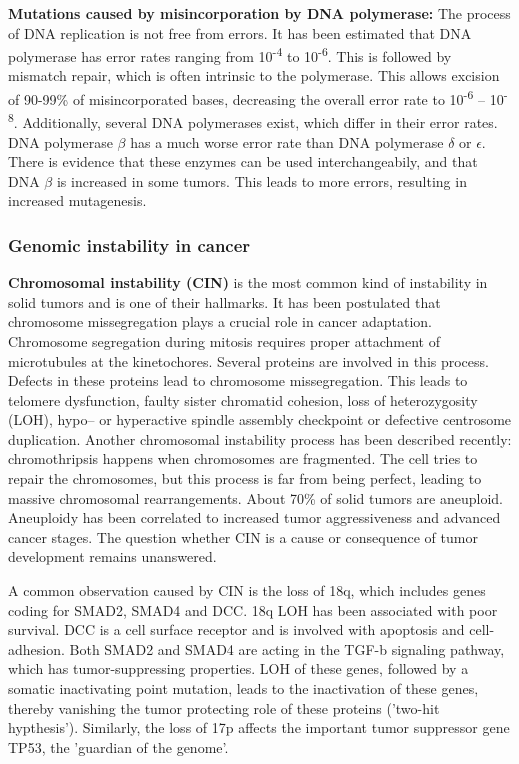     \textbf{Mutations caused by misincorporation by DNA polymerase:} The process
    of DNA replication is not free from errors. It has been estimated that DNA
    polymerase has error rates ranging from 10\textsuperscript{-4} to
    10\textsuperscript{-6}. This is followed by mismatch repair, which is often
    intrinsic to the polymerase. This allows
    excision of 90-99\% of misincorporated bases, decreasing the overall error
    rate to 10\textsuperscript{-6} -- 10\textsuperscript{-8}. Additionally,
    several DNA polymerases exist, which differ in their error rates. DNA
    polymerase $\beta$ has a much worse error rate than DNA polymerase $\delta$
    or $\epsilon$. There is evidence that these enzymes can be used
    interchangeabily, and that DNA $\beta$ is increased in some tumors. This
    leads to more errors, resulting in increased mutagenesis.

    \subsubsection{Genomic instability in cancer}

      \textbf{Chromosomal instability (CIN)} is the most common kind of
      instability in solid tumors and is one of their hallmarks. It has been
      postulated that chromosome missegregation plays a crucial role in cancer
      adaptation. Chromosome segregation during mitosis requires proper
      attachment of microtubules at the kinetochores. Several proteins are
      involved in this process. Defects in these proteins lead to chromosome
      missegregation. This leads to telomere dysfunction,  faulty sister
      chromatid cohesion, loss of heterozygosity (LOH), hypo-- or hyperactive
      spindle assembly checkpoint or defective centrosome duplication. Another
      chromosomal instability process has been described recently:
      chromothripsis happens when chromosomes are fragmented. The cell tries to
      repair the chromosomes, but this process is far from being perfect,
      leading to massive chromosomal rearrangements. About 70\% of solid tumors
      are aneuploid. Aneuploidy has been correlated to increased tumor
      aggressiveness and advanced cancer stages. The question whether CIN is a
      cause or consequence of tumor development remains unanswered.

      A common observation caused by CIN is the loss of 18q, which includes
      genes coding for SMAD2, SMAD4 and DCC. 18q LOH has been associated
      with poor survival. DCC is a cell surface receptor and
      is involved with apoptosis and cell-adhesion. Both SMAD2 and SMAD4 are acting
      in the TGF-b signaling pathway, which has tumor-suppressing properties.
      LOH of these genes, followed by a somatic inactivating point mutation,
      leads to the inactivation of these genes, thereby vanishing the
      tumor protecting role of these proteins ('two-hit hypthesis'). Similarly,
      the loss of 17p affects the important tumor suppressor gene TP53,
      the 'guardian of the genome'.

